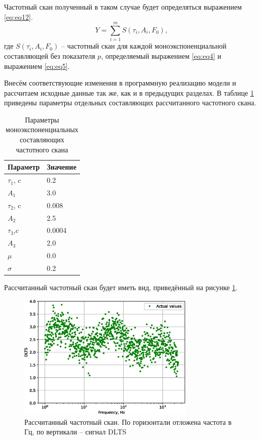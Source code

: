 \documentclass{report}
\begin{document}
        Частотный скан полученный в таком случае будет определяться выражением \ref{eq:eq12}.
        \begin{equation}
            \label{eq:eq12}
            Y=\sum_{i=1}^m S\left(\tau_i, A_i, F_0\right),
        \end{equation}
        где $S\left(\tau_i, A_i, F_0\right)$ -- частотный скан для каждой моноэкспоненциальной
        составляющей без показателя $p$, определяемый выражением \ref{eq:eq4} и выражением
        \ref{eq:eq5}.

        Внесём соответствующие изменения в программную реализацию модели и рассчитаем исходные 
        данные так же, как и в предыдущих разделах. В таблице \ref{table:table7} приведены параметры 
        отдельных составляющих рассчитанного частотного скана.
        
        \begin{table}[ht]
            \caption{Параметры моноэкспоненциальных составляющих частотного скана}
            \label{table:table7}
            \centering
            \begin{tabular}{ |l|l| }
                \hline
                Параметр & Значение \\
                \hline
                $\tau_1$, c & 0.2 \\
                $A_1$ & 3.0 \\
                \hline
                $\tau_2$, c & 0.008 \\
                $A_2$ & 2.5 \\
                \hline
                $\tau_3$,c & 0.0004 \\
                $A_3$ & 2.0 \\
                \hline
                $\mu$ & 0.0 \\
                $\sigma$ & 0.2 \\
                \hline
            \end{tabular}
        \end{table}

        Рассчитанный частотный скан будет иметь вид, приведённый на рисунке \ref{pic:pic5}.
        
        \begin{figure}
            \centering
            \includegraphics[width=0.75\textwidth]{multiexp_experimental_data}
            \caption{Рассчитанный частотный скан. По горизонтали отложена 
            частота в Гц, по вертикали -- сигнал DLTS}
            \label{pic:pic5}
        \end{figure}
\end{document}
